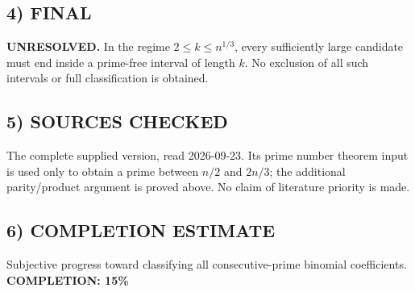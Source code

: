 \subsection*{4) FINAL}
\textbf{UNRESOLVED.} In the regime $2\le k\le n^{1/3}$, every sufficiently large candidate must end inside a prime-free interval of length $k$. No exclusion of all such intervals or full classification is obtained.
\subsection*{5) SOURCES CHECKED}
The complete supplied version, read 2026-09-23. Its prime number theorem input is used only to obtain a prime between $n/2$ and $2n/3$; the additional parity/product argument is proved above. No claim of literature priority is made.
\subsection*{6) COMPLETION ESTIMATE}
Subjective progress toward classifying all consecutive-prime binomial coefficients.
\textbf{COMPLETION: 15\%}
